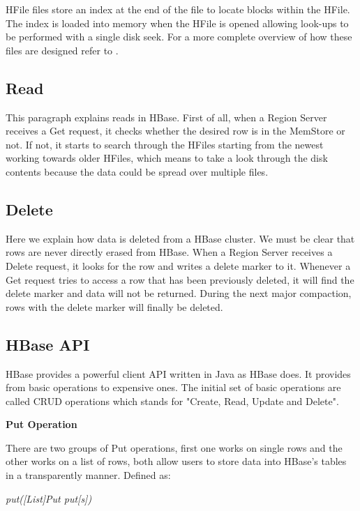 HFile files store an index at the end of the file to locate blocks within the HFile. The index is loaded into memory when the HFile is opened allowing look-ups to be performed with a single disk seek. For a more complete overview of how these files are designed refer to \cite{white2012hadoop}.

\subsection{Read}
This paragraph explains reads in HBase. First of all, when a Region Server receives a Get request, it checks whether the desired row is in the MemStore or not. If not, it starts to search through the HFiles starting from the newest working towards older HFiles, which means to take a look through the disk contents because the data could be spread over multiple files.

\subsection{Delete}
Here we explain how data is deleted from a HBase cluster. We must be clear that rows are never directly erased from HBase. When a Region Server receives a Delete request, it looks for the row and writes a delete marker to it. Whenever a Get request tries to access a row that has been previously deleted, it will find the delete marker and data will not be returned. During the next major compaction, rows with the delete marker will finally be deleted.

\subsection {HBase API}

HBase provides a powerful client API written in Java as HBase does. It provides from basic operations to expensive ones. The initial set of basic operations are called CRUD operations which stands for "Create, Read, Update and Delete".

\bigskip


\textbf{Put Operation} 

There are two groups of Put operations, first one works on single rows and the other works on a list of rows, both allow users to store data into HBase's tables in a transparently manner. Defined as:
\par
\bigskip
\centerline{\textit{put([List]Put put[s])}}
\bigskip

